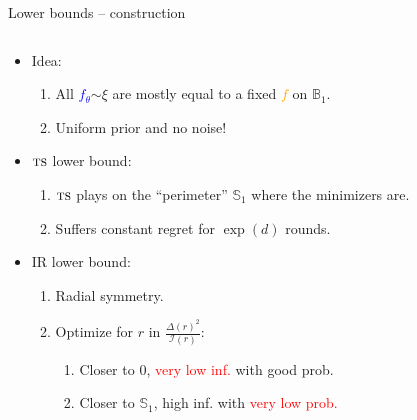 \documentclass{beamer}
\newcommand{\ball}{\mathbb{B}}
\newcommand{\sphere}{\mathbb{S}}
\newcommand{\cI}{\mathcal{I}}
\newcommand{\ts}{{\textsc{ts}}}
\begin{document}
\begin{frame}{Lower bounds -- construction}
    \begin{columns}
        \begin{column}{0.7\textwidth}
            \begin{itemize}
                \item Idea:
                      \begin{enumerate}
                          \leftskip=-1em %
                          \item All \textcolor{blue}{$f_\theta$}$\sim \xi$ are mostly equal to a fixed \textcolor{orange}{$f$} on $\ball_1$.
                          \item Uniform prior and no noise!
                      \end{enumerate}
                \item $\ts$ lower bound:
                      \begin{enumerate}
                          \leftskip=-1em %
                          \item $\ts$ plays on the ``perimeter'' $\sphere_1$ where the minimizers are.
                          \item Suffers constant regret for $\exp(d)$ rounds.
                      \end{enumerate}
                \item IR lower bound:
                      \begin{enumerate}
                          \leftskip=-1em %
                          \item Radial symmetry.
                          \item Optimize for $r$ in $\frac{\Delta(r)^2}{\cI(r)}$:
                                \begin{enumerate}
                                    \leftskip=-1em %
                                    \item Closer to $0$, \textcolor{red}{very low inf.} with \textcolor{green!70!black}{good prob}.
                                    \item Closer to $\sphere_1$, \textcolor{green!70!black}{high inf.} with \textcolor{red}{very low prob.}
                                \end{enumerate}
                      \end{enumerate}

\end{itemize}
\end{column}
\end{columns}
\end{frame}
\end{document}
